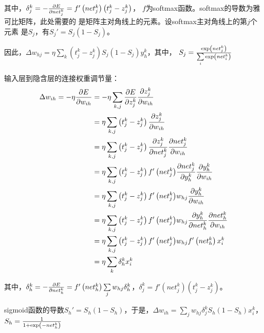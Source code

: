 \documentclass{article}
\begin{document}
其中，$\delta _j^k =  - 
{{\partial E} \over {\partial net_j^k}} = 
f'\left( {net_j^k} \right)\left( {t_j^k - z_j^k} \right)$，
$f$为softmax函数。softmax的导数为雅可比矩阵，此处需要的
是矩阵主对角线上的元素。设softmax主对角线上的第$j$个元素
是$S_j$，有${{S_j}'} = {S_j}\left( {1 - {S_j}} \right)$。

因此，$\Delta {w_{hj}} =
\eta \sum\limits_k {\left( {t_j^k - z_j^k} \right)
{S_j}\left( {1 - {S_j}} \right)y_h^k} $，其中，
${S_j} = {{\exp \left( {net_j^k} \right)} 
\over {\sum\limits_i {\exp \left( {net_i^k} \right)} }}$

输入层到隐含层的连接权重调节量：
\begin{align*}
	\Delta {w_{ih}} 
	=  - \eta {{\partial E} \over {\partial {w_{ih}}}} 
	&=  - \eta \sum\limits_{k,j} {{{\partial E} \over {\partial z_j^k}}{{\partial z_j^k} \over {\partial {w_{ih}}}}} \\
	&= \eta \sum\limits_{k,j} {\left( {t_j^k - z_j^k} \right){{\partial z_j^k} \over {\partial {w_{ih}}}}} \\
	&= \eta \sum\limits_{k,j} {\left( {t_j^k - z_j^k} \right){{\partial z_j^k} \over {\partial net_j^k}}} {{\partial net_j^k} \over {\partial {w_{ih}}}}\\
	&= \eta \sum\limits_{k,j} {\left( {t_j^k - z_j^k} \right)f'\left( {net_j^k} \right)} {{\partial net_j^k} \over {\partial y_h^k}}{{\partial y_h^k} \over {\partial {w_{ih}}}}\\
	&= \eta \sum\limits_{k,j} {\left( {t_j^k - z_j^k} \right)f'\left( {net_j^k} \right)} {w_{hj}}{{\partial y_h^k} \over {\partial {w_{ih}}}}\\
	&= \eta \sum\limits_{k,j} {\left( {t_j^k - z_j^k} \right)f'\left( {net_j^k} \right)} {w_{hj}}{{\partial y_h^k} \over {\partial net_h^k}}{{\partial net_h^k} \over {\partial {w_{ih}}}}\\
	&= \eta \sum\limits_{k,j} {\left( {t_j^k - z_j^k} \right)f'\left( {net_j^k} \right)} {w_{hj}}f'\left( {net_h^k} \right)x_i^k\\
	&= \eta \sum\limits_k {\delta _h^k} x_i^k
\end{align*}

其中，$\delta _h^k =  - {{\partial E} \over {\partial net_h^k}} = f'\left( {net_h^k} \right)\sum\limits_j {{w_{hj}}\delta _h^k} $，$\delta _j^k = f'\left( {net_j^k} \right)\left( {t_j^k - z_j^k} \right)$。

sigmoid函数的导数${{S_h}'} = {{S_h}\left( {1 - {S_h}} \right)}$，于是，$\Delta {w_{ih}} 
= \sum\limits_j {{w_{hj}}\delta _j^k} {S_h}\left( {1 - {S_h}} \right)x_i^k$，${S_h} = {1 \over {1 + \exp \left( { - net_h^k} \right)}}$
\end{document}
